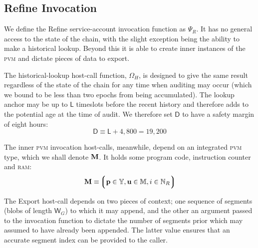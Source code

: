 \subsection{Refine Invocation}\label{sec:refineinvocation}

We define the Refine service-account invocation function as $\Psi_R$. It has no general access to the state of the \Jam chain, with the slight exception being the ability to make a historical lookup. Beyond this it is able to create inner instances of the \textsc{pvm} and dictate pieces of data to export.

The historical-lookup host-call function, $\Omega_H$, is designed to give the same result regardless of the state of the chain for any time when auditing may occur (which we bound to be less than two epochs from being accumulated). The lookup anchor may be up to $\mathsf{L}$ timeslots before the recent history and therefore adds to the potential age at the time of audit. We therefore set $\mathsf{D}$ to have a safety margin of eight hours:
\begin{equation}
  \mathsf{D} \equiv \mathsf{L} + 4,800 = 19,200
\end{equation}

The inner \textsc{pvm} invocation host-calls, meanwhile, depend on an integrated \textsc{pvm} type, which we shall denote $\mathbf{M}$. It holds some program code, instruction counter and \textsc{ram}:
\begin{equation}
  \pvm \equiv \tuple{\isa{\mathbf{p}}{\Y}, \isa{\mathbf{u}}{\ram}, \isa{i}{\N_R}}
\end{equation}

The Export host-call depends on two pieces of context; one sequence of segments (blobs of length $\mathsf{W}_G$) to which it may append, and the other an argument passed to the invocation function to dictate the number of segments prior which may assumed to have already been appended. The latter value ensures that an accurate segment index can be provided to the caller.


